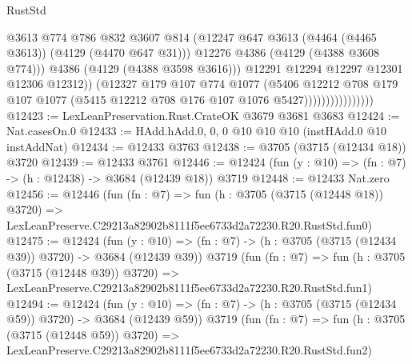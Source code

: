 \begin{lexlean}{RustStd}
\begin{coremodule}
                                      @3613
                                      @774
                                      @786
                                      @832
                                      @3607
                                      @814
                                      (@12247
                                        @647
                                        @3613
                                        (@4464 (@4465 @3613))
                                        (@4129 (@4470 @647 @31)))
                                      @12276
                                      @4386
                                      (@4129 (@4388 @3608 @774)))
                                    @4386
                                    (@4129 (@4388 @3598 @3616)))
                                  @12291
                                  @12294
                                  @12297
                                  @12301
                                  @12306
                                  @12312))
                              (@12327
                                @179
                                @107
                                @774
                                @1077
                                (@5406
                                  @12212
                                  @708
                                  @179
                                  @107
                                  @1077
                                  (@5415 @12212 @708 @176 @107 @1076 @5427))))))))))))))))
@12423 := LexLeanPreservation.Rust.CrateOK @3679 @3681 @3683
@12424 := Nat.casesOn.{0}
@12433 := HAdd.hAdd.{0, 0, 0} @10 @10 @10 (instHAdd.{0} @10 instAddNat)
@12434 := @12433 @3763
@12438 := @3705 (@3715 (@12434 @18)) @3720
@12439 := @12433 @3761
@12446 := @12424 (fun (y : @10) => (fn : @7) -> (h : @12438) -> @3684 (@12439 @18)) @3719
@12448 := @12433 Nat.zero
@12456 := @12446
    (fun (fn : @7) =>
    fun (h : @3705 (@3715 (@12448 @18)) @3720) =>
    LexLeanPreserve.C29213a82902b8111f5ee6733d2a72230.R20.RustStd.fun0)
@12475 := @12424
    (fun (y : @10) => (fn : @7) -> (h : @3705 (@3715 (@12434 @39)) @3720) -> @3684 (@12439 @39))
    @3719
    (fun (fn : @7) =>
    fun (h : @3705 (@3715 (@12448 @39)) @3720) =>
    LexLeanPreserve.C29213a82902b8111f5ee6733d2a72230.R20.RustStd.fun1)
@12494 := @12424
    (fun (y : @10) => (fn : @7) -> (h : @3705 (@3715 (@12434 @59)) @3720) -> @3684 (@12439 @59))
    @3719
    (fun (fn : @7) =>
    fun (h : @3705 (@3715 (@12448 @59)) @3720) =>
    LexLeanPreserve.C29213a82902b8111f5ee6733d2a72230.R20.RustStd.fun2)

\end{coremodule}
\end{lexlean}
